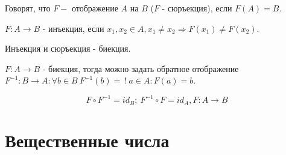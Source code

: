 \documentclass[12pt]{report}
\begin{document}
\begin{defn}
Говорят, что $F - $ отображение $A$ на $B$ ($F$ - сюръекция), если $F(A) = B$.

$F: A \to B$ - инъекция, если $x_1, x_2 \in A, x_1 \neq x_2 \Rightarrow F(x_1) \neq F(x_2)$.

Инъекция и сюръекция - биекция.
\end{defn}

\begin{defn}
$F: A \to B$  - биекция, тогда можно задать обратное отображение $F^{-1}: B \to A: \forall b \in B ~F^{-1}(b) = ~! ~a \in A: F(a) = b$.
\end{defn}

\begin{note}
$$F \circ F^{-1} = id_B; ~F^{-1} \circ F = id_A, F: A \to B$$
\end{note}

\section{Вещественные числа}
\end{document}

